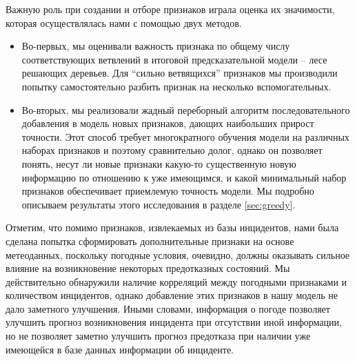 Важную роль при создании и отборе признаков играла оценка их значимости, которая осуществлялась нами с помощью двух методов.
\begin{itemize}
\item
Во-первых, мы оценивали важность признака по общему числу соответствующих ветвлений в итоговой предсказательной модели -- лесе решающих деревьев. Для ``сильно ветвящихся'' признаков мы производили попытку самостоятельно разбить признак на несколько вспомогательных.
\item Во-вторых, мы реализовали жадный переборный алгоритм последовательного добавления в модель новых признаков, дающих наибольших прирост точности. Этот способ требует многократного обучения модели на различных наборах признаков и поэтому сравнительно долог, однако он позволяет понять, несут ли новые признаки какую-то существенную новую информацию по отношению к уже имеющимся, и какой минимальный набор признаков обеспечивает приемлемую точность модели. Мы подробно описываем результаты этого исследования в разделе \ref{sec:greedy}.
\end{itemize}
Отметим, что помимо признаков, извлекаемых из базы инцидентов, нами была сделана попытка сформировать дополнительные признаки на основе метеоданных, поскольку погодные условия, очевидно, должны оказывать сильное влияние на возникновение некоторых предотказных состояний. Мы действительно обнаружили наличие корреляций между погодными признаками и количеством инцидентов, однако добавление этих признаков в нашу модель не дало заметного улучшения. Иными словами, информация о погоде позволяет улучшить прогноз возникновения инцидента при отсутствии иной информации, но не позволяет заметно улучшить прогноз предотказа при наличии уже имеющейся в базе данных информации об инциденте.



